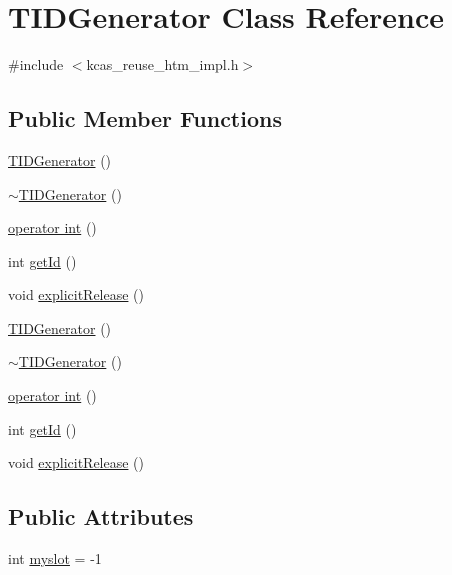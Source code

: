 \hypertarget{classTIDGenerator}{}\section{T\+I\+D\+Generator Class Reference}
\label{classTIDGenerator}


{\ttfamily \#include $<$kcas\+\_\+reuse\+\_\+htm\+\_\+impl.\+h$>$}

\subsection*{Public Member Functions}
\begin{DoxyCompactItemize}
\item 
\hyperlink{classTIDGenerator_ac7ad0b646bc78ea62d9f2e4b41c9a9b8}{T\+I\+D\+Generator} ()
\item 
\hyperlink{classTIDGenerator_ab8e583a0d6193f6d7a4d1a627505b08c}{$\sim$\+T\+I\+D\+Generator} ()
\item 
\hyperlink{classTIDGenerator_a355d43f0b8f7d1c6f04d57c9dba23124}{operator int} ()
\item 
int \hyperlink{classTIDGenerator_afa2ba75cfcd10fea959e9094eeff68e1}{get\+Id} ()
\item 
void \hyperlink{classTIDGenerator_a00436e7f9c4130726cc7c2a0e60c7b47}{explicit\+Release} ()
\item 
\hyperlink{classTIDGenerator_ac7ad0b646bc78ea62d9f2e4b41c9a9b8}{T\+I\+D\+Generator} ()
\item 
\hyperlink{classTIDGenerator_ab8e583a0d6193f6d7a4d1a627505b08c}{$\sim$\+T\+I\+D\+Generator} ()
\item 
\hyperlink{classTIDGenerator_a355d43f0b8f7d1c6f04d57c9dba23124}{operator int} ()
\item 
int \hyperlink{classTIDGenerator_afa2ba75cfcd10fea959e9094eeff68e1}{get\+Id} ()
\item 
void \hyperlink{classTIDGenerator_a00436e7f9c4130726cc7c2a0e60c7b47}{explicit\+Release} ()
\end{DoxyCompactItemize}
\subsection*{Public Attributes}
\begin{DoxyCompactItemize}
\item 
int \hyperlink{classTIDGenerator_a48936068537b5d3251113c15929b4289}{myslot} = -\/1
\end{DoxyCompactItemize}


